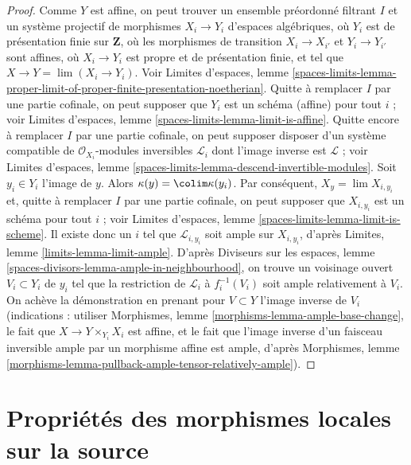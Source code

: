 \begin{proof}
\medskip\noindent
Comme $Y$ est affine, on peut trouver un ensemble préordonné filtrant $I$ et un
système projectif de morphismes $X_i \to Y_i$ d'espaces algébriques,
où $Y_i$ est de présentation finie sur $\mathbf{Z}$, où les
morphismes de transition $X_i \to X_{i'}$ et $Y_i \to Y_{i'}$ sont affines,
où $X_i \to Y_i$ est propre et de présentation finie, et tel que
$X \to Y = \lim (X_i \to Y_i)$. Voir Limites d'espaces, lemme
\ref{spaces-limits-lemma-proper-limit-of-proper-finite-presentation-noetherian}.
Quitte à remplacer $I$ par une partie cofinale, on peut supposer que $Y_i$ est un schéma (affine) pour tout $i$ ;
voir Limites d'espaces, lemme \ref{spaces-limits-lemma-limit-is-affine}.
Quitte encore à remplacer $I$ par une partie cofinale, on peut supposer disposer d'un système compatible de
$\mathcal{O}_{X_i}$-modules inversibles $\mathcal{L}_i$
dont l'image inverse est $\mathcal{L}$ ; voir
Limites d'espaces, lemme \ref{spaces-limits-lemma-descend-invertible-modules}.
Soit $y_i \in Y_i$ l'image de $y$.
Alors $\kappa(y) = \colim \kappa(y_i)$.
Par conséquent, $X_y = \lim X_{i, y_i}$ et, quitte à remplacer $I$ par une partie cofinale,
on peut supposer que $X_{i, y_i}$ est un schéma pour tout $i$ ; voir
Limites d'espaces, lemme \ref{spaces-limits-lemma-limit-is-scheme}.
Il existe donc un $i$ tel que $\mathcal{L}_{i, y_i}$
soit ample sur $X_{i, y_i}$, d'après
Limites, lemme \ref{limits-lemma-limit-ample}.
D'après Diviseurs sur les espaces, lemme \ref{spaces-divisors-lemma-ample-in-neighbourhood},
on trouve un voisinage ouvert
$V_i \subset Y_i$ de $y_i$ tel que
la restriction de $\mathcal{L}_i$ à $f_i^{-1}(V_i)$
soit ample relativement à $V_i$.
On achève la démonstration en prenant pour $V \subset Y$ l'image inverse de
$V_i$ (indications : utiliser
Morphismes, lemme \ref{morphisms-lemma-ample-base-change},
le fait que $X \to Y \times_{Y_i} X_i$ est affine,
et le fait que l'image inverse d'un
faisceau inversible ample par un morphisme affine est ample, d'après
Morphismes, lemme \ref{morphisms-lemma-pullback-ample-tensor-relatively-ample}).
\end{proof}













\section{Propriétés des morphismes locales sur la source}
\label{section-properties-morphisms-local-source}

